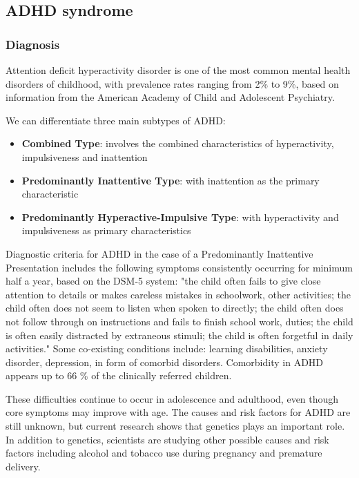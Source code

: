 \documentclass[letterpaper,10pt]{article}
\let\oldsubsection\subsection
\renewcommand{\subsection}{\def\cursectioning{subsection}\oldsubsection}
\begin{document}
\subsection{ADHD syndrome}

\subsubsection{Diagnosis}

Attention deficit hyperactivity disorder is one of the most common mental health disorders of childhood, with prevalence rates ranging from 2\% to 9\%, based on information from the American Academy of Child and Adolescent Psychiatry. \cite{pelham_fabiano_massetti_2005} 

We can differentiate three main subtypes of ADHD: \cite{market_ADHD}
\begin{itemize}
\item \textbf{Combined Type}: involves the combined characteristics of hyperactivity, impulsiveness and inattention
\item \textbf{Predominantly Inattentive Type}: with inattention as the primary characteristic
\item \textbf{Predominantly Hyperactive-Impulsive Type}: with hyperactivity and impulsiveness as primary characteristics
\end{itemize}

Diagnostic criteria for ADHD in the case of a Predominantly Inattentive Presentation includes the following symptoms consistently occurring for minimum half a year, based on the DSM-5 system: "the child often fails to give close attention to details or makes careless mistakes in schoolwork, other activities; the child often does not seem to listen when spoken to directly; the child often does not follow through on instructions and fails to finish school work, duties;  the child is often easily distracted by extraneous stimuli; the child is often forgetful in daily activities." \cite{diagnostic_criteria_adhd} Some co-existing conditions include: learning disabilities, anxiety disorder, depression, in form of comorbid disorders. Comorbidity in ADHD appears up to 66 \% of the clinically referred children. \cite{market_ADHD}

These difficulties continue to occur in adolescence and adulthood, even though core symptoms may improve with age.  \cite{pelham_fabiano_massetti_2005} The causes and risk factors for ADHD are still unknown, but current research shows that genetics plays an important role. In addition to genetics, scientists are studying other possible causes and risk factors including alcohol and tobacco use during pregnancy and premature delivery. \cite{adhd_general}
\end{document}
